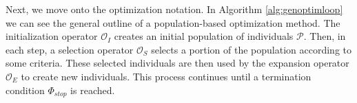 Next, we move onto the optimization notation. In Algorithm \ref{alg:genoptimloop} we can see the general outline of a population-based optimization method.
The initialization operator $\mathcal{O}_I$ creates an initial population of individuals $\mathcal{P}$. 
Then, in each step, a selection operator $\mathcal{O}_S$ selects a portion of the population according to some criteria. 
These selected individuals are then used by the expansion operator $\mathcal{O}_E$ to create new individuals.
This process continues until a termination condition $\Phi_{stop}$ is reached.
